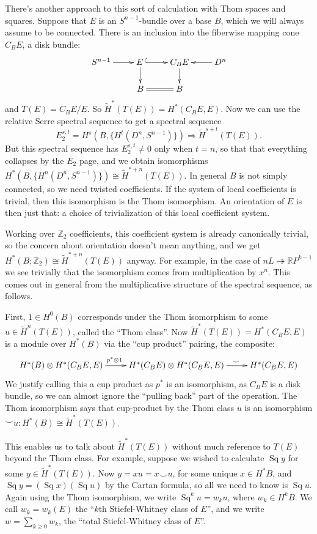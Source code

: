\documentclass{article}
\newcommand{\Z}{\mathbb{Z}}
\newcommand{\R}{\mathbb{R}}
\newcommand{\RP}{\R P}
\newcommand{\onto}{\twoheadrightarrow}
\DeclareMathOperator{\Sq}{Sq}
\begin{document}
There's another approach to this sort of calculation with Thom spaces and squares.  Suppose that $E$ is an $S^{n-1}$-bundle over a base $B$, which we will always assume to be connected. There is an inclusion into the fiberwise mapping cone $C_B E$, a disk bundle:
\[\xymatrix@R=.6cm{
S^{n-1}\ar[r]&E\,\ar@{^{(}->}[r]\ar[d]&C_BE\ar[d]&D^n\ar[l]\\
&B\ar@{=}[r]&B
}\]
and $T(E) = C_B E / E$.  So $\widetilde H^* (T(E)) = H^*(C_B E, E)$.  Now we can use the relative Serre spectral sequence to get a spectral sequence
\[
E_2^{s,t}=H^s(B, \{H^t(D^n, S^{n-1})\}) \Rightarrow \widetilde H^{s+t}( T(E))
.\]
But this spectral sequence has $E_2^{s,t}\neq0$ only when $t=n$, so that that everything collapses by the $E_2$ page, and we obtain isomorphisms $H^*(B, \{H^n(D^n, S^{n-1})\}) \cong \widetilde H^{*+n} (T(E))$.  In general $B$ is not simply connected, so we need twisted coefficients.  If the system of local coefficients is trivial, then this isomorphism is the Thom isomorphism.  An orientation of $E$ is then just that: a choice of trivialization of this local coefficient system.

Working over $\Z_2$ coefficients, this coefficient system is already canonically trivial, so the concern about orientation doesn't mean anything, and we get $H^*(B; \Z_2) \cong \widetilde H^{*+n} (T(E))$ anyway.  For example, in the case of $nL \onto \RP^{k-1}$ we see trivially that the isomorphism comes from multiplication by $x^n$.  This comes out in general from the multiplicative structure of the spectral sequence, as follows.

First, $1\in H^0 (B)$ corresponds under the Thom isomorphism to some $u \in \widetilde H^n (T(E))$, called the ``Thom class''.  Now $\widetilde H^* (T(E)) = H^*(C_B E, E)$ is a module over $H^* (B)$ via the ``cup product'' pairing, the composite:
\[\xymatrix{
H^*(B) \otimes H^*(C_B E, E)\ar[r]^{p^*\otimes1\ \ \ }&H^*(C_B E) \otimes H^*(C_B E, E)\ar[r]^{\hspace{9mm}\smile}& H^*(C_B E, E)
}\]
We justify calling this a cup product as $p^*$ is an isomorphism, as $C_BE$ is a disk bundle, so we can almost ignore the ``pulling back'' part of the operation. The Thom isomorphism says that cup-product by the Thom class $u$ is an isomorphism $\smile u: H^* (B) \cong \widetilde H^* (T(E))$.

This enables us to talk about $\widetilde H^* (T(E))$ without much reference to $T(E)$ beyond the Thom class.  For example, suppose we wished to calculate $\Sq y$ for some $y\in \widetilde H^*( T(E))$. Now $y=xu = x \smile u$, for some unique $x \in H^* B$, and $\Sq y = (\Sq x)(\Sq u)$ by the Cartan formula, so all we need to know is $\Sq u$.  Again using the Thom isomorphism, we write $\Sq^k u = w_k u$, where $w_k \in H^k B$. We call $w_k = w_k(E)$ the ``$k$th Stiefel-Whitney class of $E$'', and we write $w = \sum_{k \ge 0} w_k$, the ``total Stiefel-Whitney class of $E$''.
\end{document}
